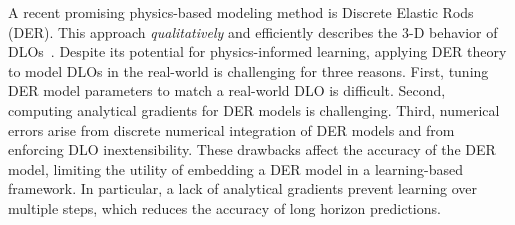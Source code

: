 A recent promising physics-based modeling method is Discrete Elastic Rods (DER).
This approach \emph{qualitatively} and efficiently describes the 3-D behavior of DLOs~\cite{originalDER, originalDER2}. 
Despite its potential for physics-informed learning, applying DER theory to model DLOs in the real-world is challenging for three reasons.
First, tuning DER model parameters to match a real-world DLO is difficult.
Second, computing analytical gradients for DER models is challenging.
Third, numerical errors arise from discrete numerical integration of DER models and from enforcing DLO inextensibility.
These drawbacks affect the accuracy of the DER model, limiting the utility of embedding a DER model in a learning-based framework.
In particular, a lack of analytical gradients prevent learning over multiple steps, which reduces the accuracy of long horizon predictions.

